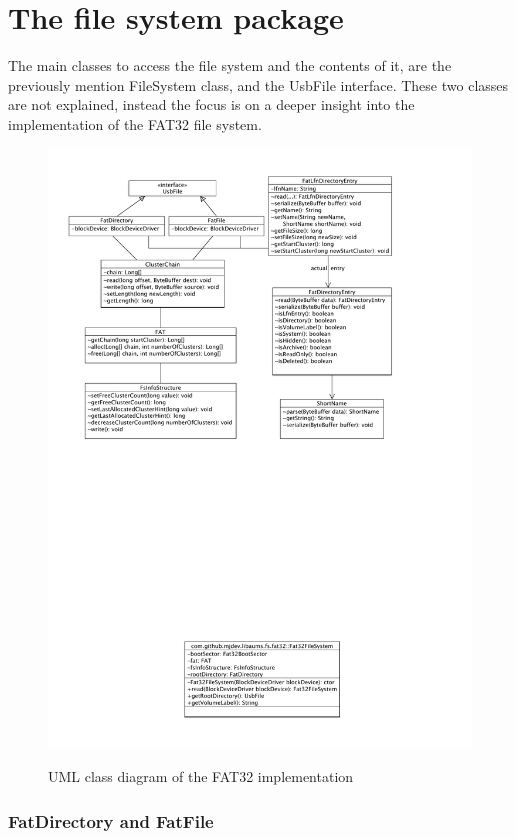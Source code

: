 \section{The file system package}

The main classes to access the file system and the contents of it, are the previously mention FileSystem class, and the UsbFile interface. These two classes are not explained, instead the focus is on a deeper insight into the implementation of the FAT32 file system.

\begin{figure}[h!]
\caption{UML class diagram of the FAT32 implementation}
\centering
\includegraphics[scale=0.97]{figures/fat_package}
\label{figure:fat_package}
\end{figure}

\subsubsection{FatDirectory and FatFile}

